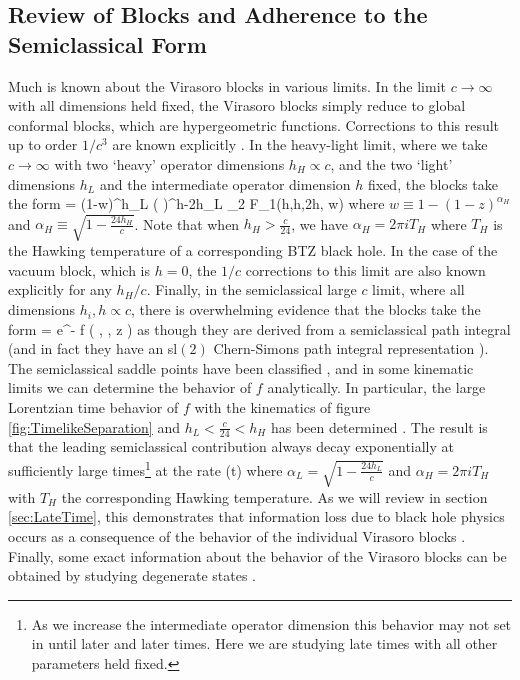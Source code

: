 \subsection{Review of Blocks and Adherence to the Semiclassical Form}
\label{sec:AdherencetoSemiclassicalLimit}

Much is known about the Virasoro blocks in various limits.    In the limit $c \to \infty$ with all dimensions held fixed, the Virasoro blocks simply reduce to global conformal blocks, which are hypergeometric functions.  Corrections to this result up to order $1/c^3$ are known explicitly \cite{Chen:2016cms}.  In the heavy-light limit, where we take $c \to \infty$ with two `heavy' operator dimensions $h_H \propto c$, and the two `light' dimensions $h_L$ and the intermediate operator dimension $h$ fixed, the blocks  take the form \cite{Fitzpatrick:2015zha}  
\be \label{eq:HeavyLightBlocks}
\CV = (1-w)^{h_L } \left(  \right)^{h-2h_L} {}_2 F_1(h,h,2h, w)
\ee
where $w \equiv 1 - (1-z)^{\alpha_H}$ and $\alpha_H \equiv \sqrt{1 - \frac{24 h_H}{c}}$.  Note that when $h_H > \frac{c}{24}$, we have $\alpha_H = 2 \pi i T_H$ where $T_H$ is the Hawking temperature of a corresponding BTZ black hole.
In the case of the vacuum block, which is $h=0$, the $1/c$ corrections to this limit are also known explicitly \cite{Fitzpatrick:2015dlt} for any $h_H/c$.  Finally, in the semiclassical large $c$ limit, where all dimensions $h_i, h\propto c$, there is overwhelming evidence that the blocks take the form
\be
\label{eq:SemiclassicalLimitofBlocks}
\CV = e^{- f \left( , , z \right)} 
\ee
as though they are derived from a semiclassical path integral (and in fact  they have an sl$(2)$ Chern-Simons path integral representation \cite{Fitzpatrick:2016mtp}).  The semiclassical saddle points  have been classified \cite{Fitzpatrick:2016mjq}, and in some kinematic limits we can determine the behavior of $f$ analytically.  In particular, the large Lorentzian time behavior of $f$ with the kinematics of figure \ref{fig:TimelikeSeparation} and  $h_L < \frac{c}{24} < h_H$ has been determined  \cite{Fitzpatrick:2016mjq}.  The result is that the leading semiclassical contribution always decay exponentially at sufficiently large times\footnote{As we increase the intermediate operator dimension this behavior may not set in until later and later times.  Here we are studying late times with all other parameters held fixed.} at the rate 
\be \label{eq:SemiclassicalLateTimeDecay}
\CV(t) \approx \exp {}
\ee
where $\alpha_L = \sqrt{1 - \frac{24 h_L}{c}}$ and $\alpha_H = 2 \pi i T_H$ with $T_H$ the corresponding Hawking temperature.  As we will review in section \ref{sec:LateTime}, this demonstrates that information loss due to black hole physics \cite{Maldacena:2001kr} occurs as a consequence of the behavior of the individual Virasoro blocks  \cite{Fitzpatrick:2016ive, Fitzpatrick:2016mjq}.  Finally, some exact information about the behavior of the Virasoro blocks can be obtained by studying degenerate states \cite{Fitzpatrick:2016ive}.

